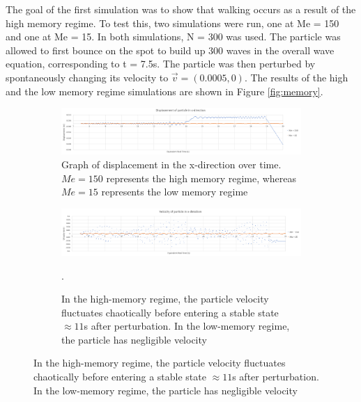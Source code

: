The goal of the first simulation was to show that walking occurs as a result of the high memory regime. To test this, two simulations were run, one at Me = 150 and one at Me = 15. In both simulations, N = 300 was used. The particle was allowed to first bounce on the spot to build up 300 waves in the overall wave equation, corresponding to t = 7.5s. The particle was then perturbed by spontaneously changing its velocity to $\vec{v} = (0.0005,0)$. The results of the high and the low memory regime simulations are shown in Figure \ref{fig:memory}. 

\begin{figure}
	\centering
	\begin{subfigure}{\textwidth}
		\includegraphics[width=\textwidth]{simulation/highmemory/displacement.png}
		\caption{Graph of displacement in the x-direction over time. $Me=150$ represents the high memory regime, whereas $Me=15$ represents the low memory regime}
		\label{fig:mem:displacement}
	\end{subfigure}
	
	\begin{subfigure}{\textwidth}
		\includegraphics[width=\textwidth]{simulation/highmemory/velocity.png}
		\caption{In the high-memory regime, the particle velocity fluctuates chaotically before entering a stable state $\approx 11$s after perturbation. In the low-memory regime, the particle has negligible velocity}
		\label{fig:mem:velocity}.
	\end{subfigure}
	

\end{figure}
